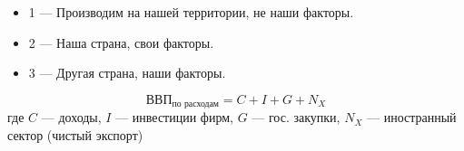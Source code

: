 \documentclass{article}
\begin{document}
    \begin{center}
    \end{center}

    \begin{itemize}
        \item 1 --- Производим на нашей территории, не наши факторы.
        \item 2 --- Наша страна, свои факторы.
        \item 3 --- Другая страна, наши факторы.
    \end{itemize}


    \begin{equation}
        \text{ВВП}_{\text{по расходам}} = C + I + G + N_{X}
    \end{equation}
    где $C$ --- доходы, $I$ --- инвестиции фирм, $G$ --- гос. закупки, $N_{X}$ --- иностранный сектор (чистый экспорт)
\end{document}

